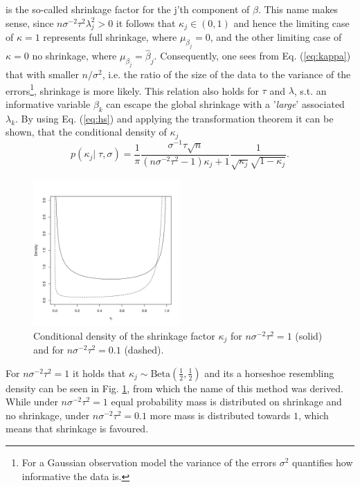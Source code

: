 \documentclass[12pt,letterpaper]{article}
\numberwithin{equation}{subsection}
\begin{document}
is the so-called shrinkage factor for the j'th component of $\beta$. This name makes sense, since $n\sigma^{-2}\tau^2\lambda^2_j > 0$ it follows that $\kappa_j \in (0,1)$ and hence the limiting case of $\kappa = 1$ represents full shrinkage, where $\mu_{\beta_j} = 0$, and the other limiting case of $\kappa = 0$ no shrinkage, where $\mu_{\beta_j} = \hat{\beta}_j$. Consequently, one sees from Eq. (\ref{eq:kappa}) that with smaller $n/\sigma^2$, i.e. the ratio of the size of the data to the variance of the errors\footnote{For a Gaussian observation model the variance of the errors $\sigma^2$ quantifies how informative the data is. }, shrinkage is more likely. This relation also holds for $\tau$ and $\lambda$, s.t. an informative variable $\beta_k$ can escape the global shrinkage with a '\textit{large}' associated $\lambda_k$.
By using Eq. (\ref{eq:hs}) and applying the transformation theorem it can be shown, that the conditional density of $\kappa_j$
\begin{equation}
p(\kappa_j|\;\tau,\sigma) = \frac{1}{\pi}\frac{\sigma^{-1}\tau\sqrt{n}}{(n\sigma^{-2}\tau^2 - 1)\kappa_j + 1}\frac{1}{\sqrt{\kappa_j}\sqrt{1-\kappa_j}}. 
\label{eq:pkappa}
\end{equation}
\begin{figure}[bt!]
 \centering
 \includegraphics[width=0.5\textwidth]{../plots/kappa.pdf}
 \caption[Conditional density of the shrinkage factor $\kappa_j$]{Conditional density of the shrinkage factor $\kappa_j$ for $n\sigma^{-2}\tau^2 = 1$ (solid) and 
 for $n\sigma^{-2}\tau^2 = 0.1$ (dashed).}
 \label{fig:hs}
\end{figure}
For $n\sigma^{-2}\tau^2 = 1$ it holds that $\kappa_j \sim \text{Beta}(\frac{1}{2},\frac{1}{2})$ and its a horseshoe resembling density can be seen in Fig. \ref{fig:hs}, from which the name of this method was derived. While under $n\sigma^{-2}\tau^2 = 1$ equal probability mass is distributed on shrinkage and no shrinkage, under  $n\sigma^{-2}\tau^2 = 0.1$ more mass is distributed towards $1$, which means that shrinkage is favoured.
\FloatBarrier
\end{document}

